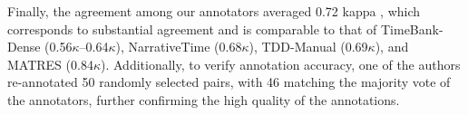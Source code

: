 





Finally, the agreement among our annotators averaged 0.72 kappa \cite{kappa-1973}, which corresponds to substantial agreement and is comparable to that of TimeBank-Dense (0.56$\kappa$–0.64$\kappa$), NarrativeTime (0.68$\kappa$), TDD-Manual (0.69$\kappa$), and MATRES (0.84$\kappa$). Additionally, to verify annotation accuracy, one of the authors re-annotated 50 randomly selected pairs, with 46 matching the majority vote of the annotators, further confirming the high quality of the annotations.


